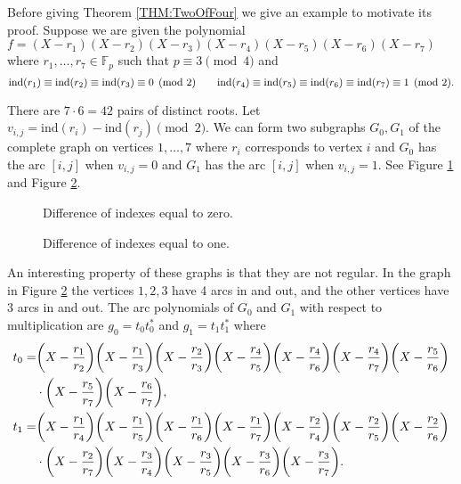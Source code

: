 \documentclass{article}
\let\originalleft\left
\let\originalright\right
\renewcommand{\left}{\mathopen{}\mathclose\bgroup\originalleft}
\renewcommand{\right}{\aftergroup\egroup\originalright}
\theoremstyle{plain}
\theoremstyle{definition}
\def\Fp {{ \mathbb{F} _ {p} }}
\def\ind {{ \mathrm{ind} }}
\begin{document}
		Before giving Theorem \ref{THM:TwoOfFour} we give an example to motivate its proof. Suppose we are given the polynomial $f = (X-r_1)(X-r_2)(X-r_3)(X-r_4)(X-r_5)(X-r_6)(X-r_7)$ where $r_1,\ldots,r_7 \in \Fp$ such that $p \equiv 3 \pmod 4$ and 
		\[ \ind\left(r_1\right) \equiv \ind\left(r_2\right) \equiv \ind\left(r_3\right) \equiv 0 \pmod 2  \quad\quad \ind\left(r_4\right) \equiv \ind\left(r_5\right) \equiv \ind\left(r_6\right) \equiv \ind\left(r_7\right) \equiv 1 \pmod 2. \]
		
		\noindent There are $7\cdot6=42$ pairs of distinct roots. Let $v_{i,j}=\ind(r_i)-\ind(r_j) \pmod 2$. We can form two subgraphs $G_0,G_1$ of the complete graph on vertices $1,\dots,7$ where $r_i$ corresponds to vertex $i$ and $G_0$ has the arc $[i,j]$ when $v_{i,j}=0$ and $G_1$ has the arc $[i,j]$ when $v_{i,j}=1$. See Figure \ref{dontFail1} and Figure \ref{dontFail2}.
		\begin{center}
		    \begin{figure}  \caption{Difference of indexes equal to zero.} \label{dontFail1} \end{figure}
        \begin{figure}  \caption{Difference of indexes equal to one.}  \label{dontFail2} \end{figure}
		\end{center}
		An interesting property of these graphs is that they are not regular. In the graph in Figure \ref{dontFail2} the vertices $1,2,3$ have 4 arcs in and out, and the other vertices have 3 arcs in and out.  The arc polynomials of $G_0$ and $G_1$ with respect to multiplication are $g_0=t_0t_0^{\ast}$ and $g_1=t_1t_1^{\ast}$ where  
		\begin{alignat*}{2}
				t_0 =& \left(X-\frac{r_1}{r_2}\right)\left(X-\frac{r_1}{r_3}\right)\left(X-\frac{r_2}{r_3}\right) \left(X-\frac{r_4}{r_5}\right)\left(X-\frac{r_4}{r_6}\right)\left(X-\frac{r_4}{r_7}\right)\left(X-\frac{r_5}{r_6}\right) \\
				     & \cdot\left(X-\frac{r_5}{r_7}\right)\left(X-\frac{r_6}{r_7}\right),                                                     \\
		    t_1 =& \left(X-\frac{r_1}{r_4} \right)\left(X-\frac{r_1}{r_5}\right)\left(X-\frac{r_1}{r_6}\right)\left(X-\frac{r_1}{r_7}\right)\left(X-\frac{r_2}{r_4}\right)\left(X-\frac{r_2}{r_5}\right)\left(X-\frac{r_2}{r_6}\right)  \\ 
		         & \cdot\left(X-\frac{r_2}{r_7}\right)\left(X-\frac{r_3}{r_4}\right)\left(X-\frac{r_3}{r_5}\right)\left(X-\frac{r_3}{r_6}\right)\left(X-\frac{r_3}{r_7} \right) .
		\end{alignat*}
		
\end{document}
